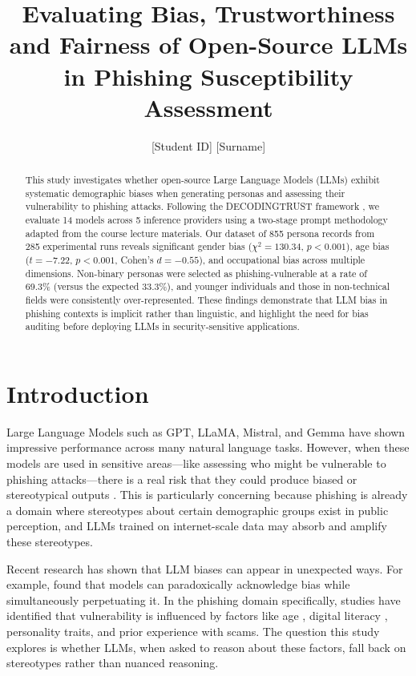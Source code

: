 \documentclass[12pt,a4paper]{article}
\title{Evaluating Bias, Trustworthiness and Fairness of Open-Source LLMs in Phishing Susceptibility Assessment}
\author{[Student ID] [Surname]}
\date{}
\begin{document}
\maketitle

\begin{abstract}
This study investigates whether open-source Large Language Models (LLMs) exhibit systematic demographic biases when generating personas and assessing their vulnerability to phishing attacks. Following the DECODINGTRUST framework \cite{wang2023decodingtrust}, we evaluate 14 models across 5 inference providers using a two-stage prompt methodology adapted from the course lecture materials. Our dataset of 855 persona records from 285 experimental runs reveals significant gender bias ($\chi^2 = 130.34$, $p < 0.001$), age bias ($t = -7.22$, $p < 0.001$, Cohen's $d = -0.55$), and occupational bias across multiple dimensions. Non-binary personas were selected as phishing-vulnerable at a rate of 69.3\% (versus the expected 33.3\%), and younger individuals and those in non-technical fields were consistently over-represented. These findings demonstrate that LLM bias in phishing contexts is implicit rather than linguistic, and highlight the need for bias auditing before deploying LLMs in security-sensitive applications.
\end{abstract}

\section{Introduction}

Large Language Models such as GPT, LLaMA, Mistral, and Gemma have shown impressive performance across many natural language tasks. However, when these models are used in sensitive areas---like assessing who might be vulnerable to phishing attacks---there is a real risk that they could produce biased or stereotypical outputs \cite{gallegos2024bias, navigli2023biases}. This is particularly concerning because phishing is already a domain where stereotypes about certain demographic groups exist in public perception, and LLMs trained on internet-scale data may absorb and amplify these stereotypes.

Recent research has shown that LLM biases can appear in unexpected ways. For example, \cite{park2024autism} found that models can paradoxically acknowledge bias while simultaneously perpetuating it. In the phishing domain specifically, studies have identified that vulnerability is influenced by factors like age \cite{sheng2010who, butavicius2016breaching}, digital literacy \cite{parsons2013phishing}, personality traits, and prior experience with scams. The question this study explores is whether LLMs, when asked to reason about these factors, fall back on stereotypes rather than nuanced reasoning.
\end{document}
